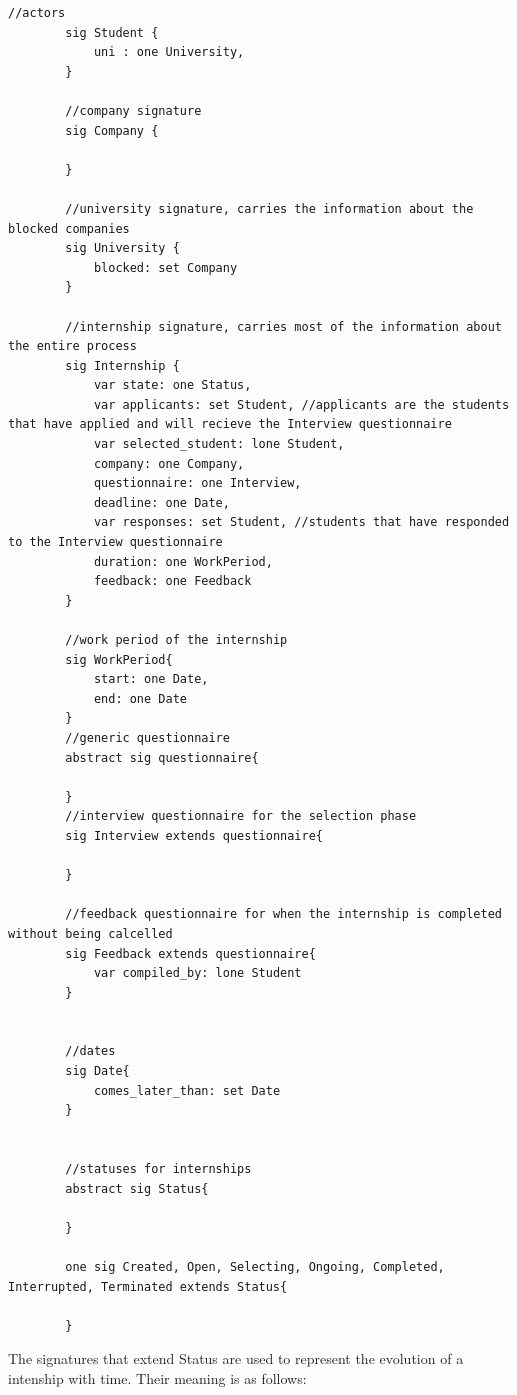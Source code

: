 \begin{lstlisting}[language=Alloy]
        //actors
        sig Student {
            uni : one University,
        }
        
        //company signature
        sig Company {
            
        }
         
        //university signature, carries the information about the blocked companies
        sig University {
            blocked: set Company
        }
        
        //internship signature, carries most of the information about the entire process
        sig Internship {
            var state: one Status,
            var applicants: set Student, //applicants are the students that have applied and will recieve the Interview questionnaire
            var selected_student: lone Student,
            company: one Company,
            questionnaire: one Interview,
            deadline: one Date,
            var responses: set Student, //students that have responded to the Interview questionnaire
            duration: one WorkPeriod,
            feedback: one Feedback
        }
        
        //work period of the internship
        sig WorkPeriod{
            start: one Date,
            end: one Date
        }
        //generic questionnaire
        abstract sig questionnaire{
            
        }
        //interview questionnaire for the selection phase
        sig Interview extends questionnaire{
            
        }
        
        //feedback questionnaire for when the internship is completed without being calcelled
        sig Feedback extends questionnaire{
            var compiled_by: lone Student
        }
        
        
        //dates 
        sig Date{
            comes_later_than: set Date
        }
        
        
        //statuses for internships
        abstract sig Status{
        
        }
        
        one sig Created, Open, Selecting, Ongoing, Completed, Interrupted, Terminated extends Status{
        
        }      
\end{lstlisting}

\par The signatures that extend Status are used to represent the evolution of a intenship with time. Their meaning is
as follows:


